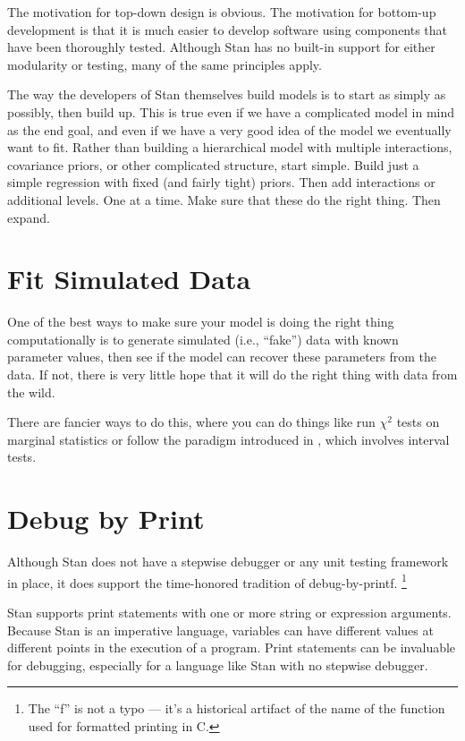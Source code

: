 The motivation for top-down design is obvious.  The motivation for
bottom-up development is that it is much easier to develop software
using components that have been thoroughly tested.  Although Stan has
no built-in support for either modularity or testing, many of the same
principles apply.  

The way the developers of Stan themselves build models is to start as
simply as possibly, then build up. This is true even if we have a
complicated model in mind as the end goal, and even if we have a very
good idea of the model we eventually want to fit.  Rather than
building a hierarchical model with multiple interactions, covariance
priors, or other complicated structure, start simple.  Build just a
simple regression with fixed (and fairly tight) priors.  Then add
interactions or additional levels.  One at a time.  Make sure that
these do the right thing.  Then expand.

\section{Fit Simulated Data}

One of the best ways to make sure your model is doing the right thing
computationally is to generate simulated (i.e., ``fake'') data with
known parameter values, then see if the model can recover these
parameters from the data.  If not, there is very little hope that it
will do the right thing with data from the wild.  

There are fancier ways to do this, where you can do things like run
$\chi^2$ tests on marginal statistics or follow the paradigm
introduced in \citep{CookGelmanRubin:2006}, which involves interval
tests.  

\section{Debug by Print}

Although Stan does not have a stepwise debugger or any unit testing
framework in place, it does support the time-honored tradition of
debug-by-printf.%
%
\footnote{The ``f'' is not a typo --- it's a historical artifact of
  the name of the  function used for formatted printing
  in C.} 

Stan supports print statements with one or more string or expression
arguments.  Because Stan is an imperative language, variables can have
different values at different points in the execution of a program.
Print statements can be invaluable for debugging, especially for a
language like Stan with no stepwise debugger.

